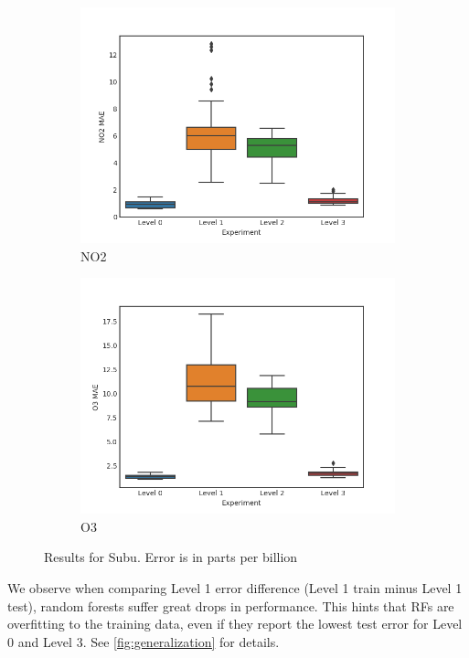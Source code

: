 \documentclass{article}
\begin{document}
\begin{figure}[H]
\centering
\begin{subfigure}{0.45\textwidth}
\includegraphics[width=\textwidth]{results/subu/no2.png}
\caption{NO2}
\end{subfigure}
\begin{subfigure}{0.45\textwidth}
\includegraphics[width=\textwidth]{results/subu/o3.png}
\caption{O3}
\end{subfigure}
\caption{Results for Subu. Error is in parts per billion}
\label{fig:results-subu}
\end{figure}


We observe when comparing Level 1 error difference (Level 1 train minus Level 1 test), random forests suffer great
drops in performance.
This hints that RFs are overfitting to the training data, even if they
report the lowest test error for Level 0 and Level 3.  See \autoref{fig:generalization} for 
details.
\end{document}
